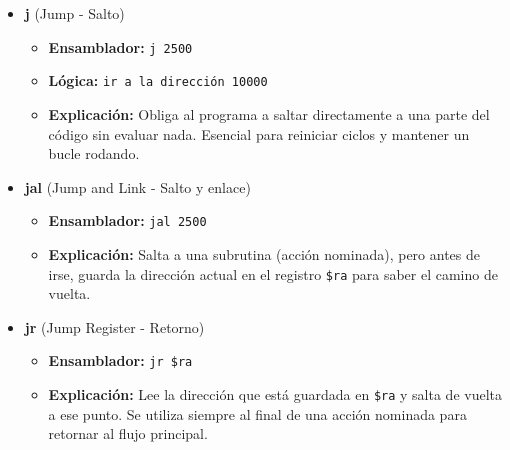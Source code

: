 \documentclass{article}
\begin{document}
\begin{itemize}
    \item \textbf{\large j} (Jump - Salto)
    \begin{itemize}
        \item \textbf{Ensamblador:} \texttt{j 2500}
        \item \textbf{Lógica:} \texttt{ir a la dirección 10000}
        \item \textbf{Explicación:} Obliga al programa a saltar directamente a una parte del código sin evaluar nada. Esencial para reiniciar ciclos y mantener un bucle rodando.
    \end{itemize}
    \vspace{0.2cm}

    \item \textbf{\large jal} (Jump and Link - Salto y enlace)
    \begin{itemize}
        \item \textbf{Ensamblador:} \texttt{jal 2500}
        \item \textbf{Explicación:} Salta a una subrutina (acción nominada), pero antes de irse, guarda la dirección actual en el registro \texttt{\$ra} para saber el camino de vuelta.
    \end{itemize}
    \vspace{0.2cm}

    \item \textbf{\large jr} (Jump Register - Retorno)
    \begin{itemize}
        \item \textbf{Ensamblador:} \texttt{jr \$ra}
        \item \textbf{Explicación:} Lee la dirección que está guardada en \texttt{\$ra} y salta de vuelta a ese punto. Se utiliza siempre al final de una acción nominada para retornar al flujo principal.
    \end{itemize}
\end{itemize}
\end{document}
